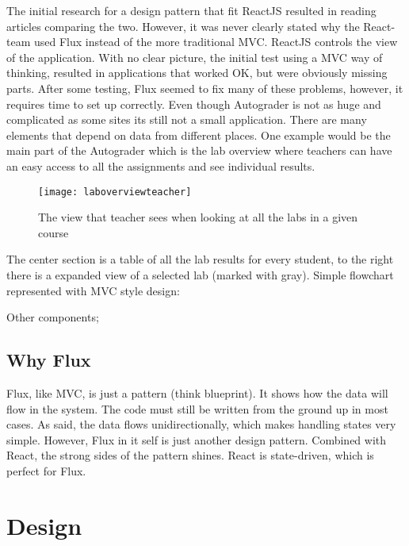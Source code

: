 



 The initial research for a design pattern that fit ReactJS resulted in reading articles comparing the two. However, it was never clearly stated why the React-team used Flux instead of the more traditional MVC. ReactJS controls the view of the application. With no clear picture, the initial test using a MVC way of thinking, resulted in applications that worked OK, but were obviously missing parts. After some testing, Flux seemed to fix many of these problems, however, it requires time to set up correctly. Even though Autograder is not as huge and complicated as some sites its still not a small application. There are many elements that depend on data from different places. One example would be the main part of the Autograder which is the lab overview where teachers can have an easy access to all the assignments and see individual results. 
 
 
\begin{figure}[h]
  {\texttt{[image: laboverviewteacher]}}
  \caption{The view that teacher sees when looking at all the labs in a given course}
  \label{fig:laboverwievteacher}
\end{figure}

The center section is a table of all the lab results for every student, to the right there is a expanded view of a selected lab (marked with gray).
Simple flowchart represented with MVC style design:

Other components;



\subsection{Why Flux}
Flux, like MVC, is just a pattern (think blueprint). It shows how the data will flow in the system. The code must still be written from the ground up in most cases. As said, the data flows unidirectionally, which makes handling states very simple. However, Flux in it self is just another design pattern. Combined with React, the strong sides of the pattern shines. React is state-driven, which is perfect for Flux.







\section{Design}

